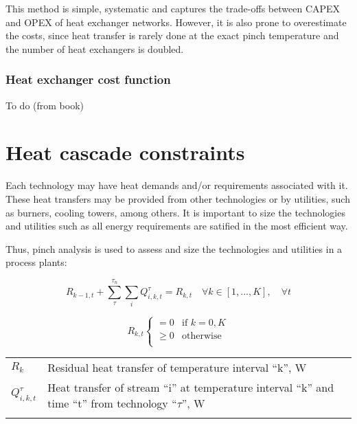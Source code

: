\documentclass[10pt,twoside,a4paper]{report}
\begin{document}
This method is simple, systematic and captures the trade-offs between
CAPEX and OPEX of heat exchanger networks. However, it is also prone
to overestimate the costs, since heat transfer is rarely done at the
exact pinch temperature and the number of heat exchangers is doubled.

\subsubsection{Heat exchanger cost function}

To do (from book)

\section{Heat cascade constraints}

Each technology may have heat demands and/or requirements associated
with it. These heat transfers may be provided from other technologies
or by utilities, such as burners, cooling towers, among others. It is
important to size the technologies and utilities such as all energy
requirements are satified in the most efficient way.

Thus, pinch analysis is used to assess and size the technologies and
utilities in a process plants:

\begin{equation}
  \label{eq:pinch_1}
  R_{k-1,t}+\sum_\tau^{\tau_n}\sum_i Q_{i,k,t}^\tau = R_{k,t} \quad \forall k \in [1,...,K], \quad \forall t
\end{equation}


\begin{equation}
  \label{eq:pinch_2}
  R_{k,t}
  \begin{cases}
     = 0 & \text{if $k=0,K$}\\
    \geq 0 & \text{otherwise} \\
  \end{cases}
\end{equation}

\begin{tabular}[h]{ll}
  $R_k$ & Residual heat transfer of temperature interval ``k'', W\\
  $Q_{i,k,t}^\tau$ & Heat transfer of stream ``i'' at temperature interval ``k'' and time ``t'' from technology ``$\tau$'', W\\
  \\
\end{tabular}
\end{document}
